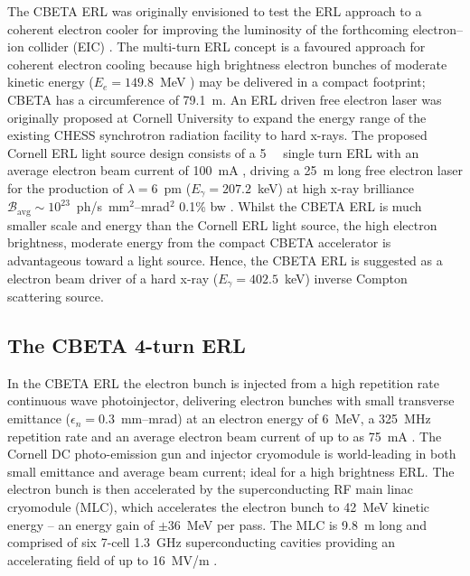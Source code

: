 \documentclass[../main.tex]{subfiles}
\begin{document}
The CBETA ERL was originally envisioned to test the ERL approach to a coherent electron cooler \cite{derbenev1991coherent,litvinenko2009coherent} for improving the luminosity of the forthcoming electron--ion collider (EIC) \cite{willeke2021electron}. The multi-turn ERL concept is a favoured approach for coherent electron cooling because high brightness electron bunches of moderate kinetic energy ($E_{e} = 149.8$~\si{\mega\electronvolt} \cite{willeke2021electron}) may be delivered in a compact footprint; CBETA has a circumference of 79.1~\si{\meter}. An ERL driven free electron laser \cite{bazarov2003lattice,gruner2001study,bilderback2006status} was originally proposed at Cornell University to expand the energy range of the existing CHESS synchrotron radiation facility \cite{batterman1979chess,CHESSstructuralmaterialsbeamline} to hard x-rays. The proposed Cornell ERL light source design consists of a 5~\si{\giga\electonvolt} single turn ERL with an average electron beam current of 100~\si{\milli\ampere} \cite{bazarov2003lattice,gruner2001study,bilderback2006status}, driving a 25~\si{\meter} long free electron laser for the production of $\lambda = 6$~\si{\pico\meter} ($E_{\gamma} = 207.2$~\si{\kilo\electronvolt}) at high x-ray brilliance $\mathcal{B}_{\mathrm{avg}}\sim 10^{23}$~ph/\si{\second}~\si{\milli\meter}$^{2}$--\si{\milli\radian}$^{2}$ 0.1\% bw \cite{bilderback2006status}. Whilst the CBETA ERL is much smaller scale and energy than the Cornell ERL light source, the high electron brightness, moderate energy from the compact CBETA accelerator is advantageous toward a light source. Hence, the CBETA ERL is suggested as a electron beam driver of a hard x-ray ($E_{\gamma} = 402.5$~\si{\kilo\electronvolt}) inverse Compton scattering source.

\subsection{The CBETA 4-turn ERL}

In the CBETA ERL the electron bunch is injected from a high repetition rate continuous wave photoinjector, delivering electron bunches with small transverse emittance ($\epsilon_{n} = 0.3$~\si{\milli\meter}--\si{\milli\radian}) at an electron energy of 6~\si{\mega\electronvolt}, a 325~\si{\mega\hertz} repetition rate and an average electron beam current of up to as 75~\si{\milli\ampere} \cite{bartnik2015operational}. The Cornell DC photo-emission gun and injector cryomodule is world-leading in both small emittance and average beam current; ideal for a high brightness ERL. The electron bunch is then accelerated by the superconducting RF main linac cryomodule (MLC), which accelerates the electron bunch to 42~\si{\mega\electronvolt} kinetic energy -- an energy gain of $\pm 36$~\si{\mega\electronvolt} per pass. The MLC is 9.8~\si{\meter} long and comprised of six 7-cell 1.3~\si{\giga\hertz} superconducting cavities providing an accelerating field of up to 16~\si{\mega\volt}/\si{\meter} \cite{hoffstaetter2017cbeta}.
\end{document}
